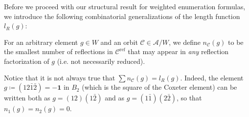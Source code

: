 \documentclass[ALCO, Unicode]{cedram}
\newcommand{\op}[1]{\operatorname{#1}}
\newcommand{\op}[1]{\operatorname{#1}}
\begin{document}
Before we proceed with our structural result for weighted enumeration formulas, we introduce the following combinatorial generalizations of the length function $l_R(g)$:

\begin{defi}\label{Defn: special reflection lengths n_C}
For an arbitrary element $g\in W$ and an orbit $\mathcal{C}\in\mathcal{A}/W$, we define $n_{\mathcal{C}}(g)$ to be the smallest number of reflections in $\mathcal{C}^{\op{ref}}$ that may appear in \emph{any} reflection factorization of $g$ \textup{(}i.e. not necessarily reduced\textup{)}.
\end{defi}

\begin{rema}
Notice that it is not always true that $\sum n_{\mathcal{C}}(g)=l_R(g)$. Indeed, the element $g\coloneqq (12\bar{1}\bar{2})=-\bm 1$ in $B_2$ (which is the square of the Coxeter element) can be written both as $g=(12)(1\bar{2})$ and as $g=(1\bar{1})(2\bar{2})$, so that $n_1(g)=n_2(g)=0$.
\end{rema}
\end{document}
